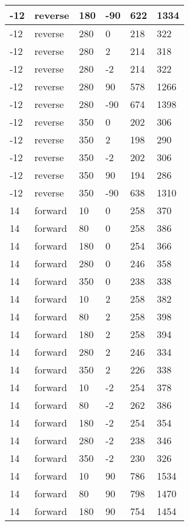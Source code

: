 \begin{table}
\begin{center}
\begin{tabular}{|l|l|l|l|l|l|}
			\hline
			-12 & reverse & 180 & -90 & 622 & 1334 \\
			\hline
			-12 & reverse & 280 & 0 & 218 & 322 \\
			\hline
			-12 & reverse & 280 & 2 & 214 & 318 \\
			\hline
			-12 & reverse & 280 & -2 & 214 & 322 \\
			\hline
			-12 & reverse & 280 & 90 & 578 & 1266 \\
			\hline
			-12 & reverse & 280 & -90 & 674 & 1398 \\
			\hline
			-12 & reverse & 350 & 0 & 202 & 306 \\
			\hline
			-12 & reverse & 350 & 2 & 198 & 290 \\
			\hline
			-12 & reverse & 350 & -2 & 202 & 306 \\
			\hline
			-12 & reverse & 350 & 90 & 194 & 286 \\
			\hline
			-12 & reverse & 350 & -90 & 638 & 1310 \\
			\hline
			14 & forward & 10 & 0 & 258 & 370 \\
			\hline
			14 & forward & 80 & 0 & 258 & 386 \\
			\hline
			14 & forward & 180 & 0 & 254 & 366 \\
			\hline
			14 & forward & 280 & 0 & 246 & 358 \\
			\hline
			14 & forward & 350 & 0 & 238 & 338 \\
			\hline
			14 & forward & 10 & 2 & 258 & 382 \\
			\hline
			14 & forward & 80 & 2 & 258 & 398 \\
			\hline
			14 & forward & 180 & 2 & 258 & 394 \\
			\hline
			14 & forward & 280 & 2 & 246 & 334 \\
			\hline
			14 & forward & 350 & 2 & 226 & 338 \\
			\hline
			14 & forward & 10 & -2 & 254 & 378 \\
			\hline
			14 & forward & 80 & -2 & 262 & 386 \\
			\hline
			14 & forward & 180 & -2 & 254 & 354 \\
			\hline
			14 & forward & 280 & -2 & 238 & 346 \\
			\hline
			14 & forward & 350 & -2 & 230 & 326 \\
			\hline
			14 & forward & 10 & 90 & 786 & 1534 \\
			\hline
			14 & forward & 80 & 90 & 798 & 1470 \\
			\hline
			14 & forward & 180 & 90 & 754 & 1454 \\

\end{tabular}
\end{center}
\end{table}
